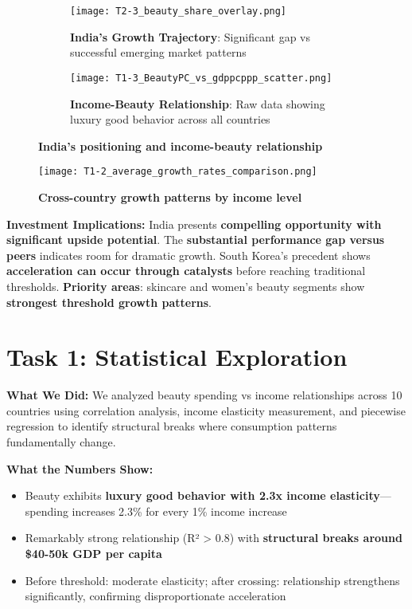 \documentclass[11pt]{article}
\begin{document}
\begin{figure}[H]
\centering
\begin{subfigure}[b]{0.48\textwidth}
    \texttt{[image: T2-3\_beauty\_share\_overlay.png]}
    \caption{\textbf{India's Growth Trajectory}: Significant gap vs successful emerging market patterns}
\end{subfigure}
\hfill
\begin{subfigure}[b]{0.48\textwidth}
    \texttt{[image: T1-3\_BeautyPC\_vs\_gdppcppp\_scatter.png]}
    \caption{\textbf{Income-Beauty Relationship}: Raw data showing luxury good behavior across all countries}
\end{subfigure}
\caption{\textbf{India's positioning and income-beauty relationship}}
\end{figure}

\begin{figure}[H]
\centering
\texttt{[image: T1-2\_average\_growth\_rates\_comparison.png]}
\caption{\textbf{Cross-country growth patterns by income level}}
\end{figure}

\textbf{Investment Implications:} India presents \textbf{compelling opportunity with significant upside potential}. The \textbf{substantial performance gap versus peers} indicates room for dramatic growth. South Korea's precedent shows \textbf{acceleration can occur through catalysts} before reaching traditional thresholds. \textbf{Priority areas}: skincare and women's beauty segments show \textbf{strongest threshold growth patterns}.

\section{Task 1: Statistical Exploration}

\textbf{What We Did:} We analyzed beauty spending vs income relationships across 10 countries using correlation analysis, income elasticity measurement, and piecewise regression to identify structural breaks where consumption patterns fundamentally change.

\textbf{What the Numbers Show:}
\vspace{-5pt}
\begin{itemize}
    \setlength{\itemsep}{-2pt}
    \item Beauty exhibits \textbf{luxury good behavior with 2.3x income elasticity}—spending increases 2.3\% for every 1\% income increase
    \item Remarkably strong relationship (R² > 0.8) with \textbf{structural breaks around \$40-50k GDP per capita}
    \item Before threshold: moderate elasticity; after crossing: relationship strengthens significantly, confirming disproportionate acceleration
\end{itemize}
\end{document}
